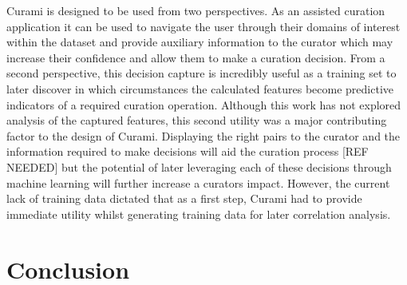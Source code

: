 \documentclass{bmcart}
\begin{document}
Curami is designed to be used from two perspectives. As an assisted curation application it can be used to navigate the user through their domains of interest within the dataset and provide auxiliary information to the curator which may increase their confidence and allow them to make a curation decision. From a second perspective, this decision capture is incredibly useful as a training set to later discover in which circumstances the calculated features become predictive indicators of a required curation operation. Although this work has not explored analysis of the captured features, this second utility was a major contributing factor to the design of Curami. Displaying the right pairs to the curator and the information required to make decisions will aid the curation process [REF NEEDED] but the potential of later leveraging each of these decisions through machine learning will further increase a curators impact. However, the current lack of training data dictated that as a first step, Curami had to provide immediate utility whilst generating training data for later correlation analysis.



\section*{Conclusion}


\end{document}
